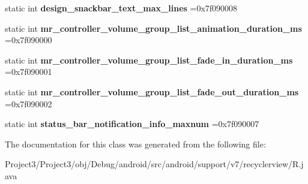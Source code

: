 \begin{DoxyCompactItemize}
static int {\bfseries design\+\_\+snackbar\+\_\+text\+\_\+max\+\_\+lines} =0x7f090008
\item 
\mbox{\label{classandroid_1_1support_1_1v7_1_1recyclerview_1_1R_1_1integer_a4c830a8a4193b80e7b9346ac0d477501}} 
static int {\bfseries mr\+\_\+controller\+\_\+volume\+\_\+group\+\_\+list\+\_\+animation\+\_\+duration\+\_\+ms} =0x7f090000
\item 
\mbox{\label{classandroid_1_1support_1_1v7_1_1recyclerview_1_1R_1_1integer_a21caea0e9a36238135e4ee26e6438a62}} 
static int {\bfseries mr\+\_\+controller\+\_\+volume\+\_\+group\+\_\+list\+\_\+fade\+\_\+in\+\_\+duration\+\_\+ms} =0x7f090001
\item 
\mbox{\label{classandroid_1_1support_1_1v7_1_1recyclerview_1_1R_1_1integer_ac7758b9bbe417e13ca6dc466fc63c0f5}} 
static int {\bfseries mr\+\_\+controller\+\_\+volume\+\_\+group\+\_\+list\+\_\+fade\+\_\+out\+\_\+duration\+\_\+ms} =0x7f090002
\item 
\mbox{\label{classandroid_1_1support_1_1v7_1_1recyclerview_1_1R_1_1integer_a0d4538d33f5c954842ebcd45556b3398}} 
static int {\bfseries status\+\_\+bar\+\_\+notification\+\_\+info\+\_\+maxnum} =0x7f090007
\end{DoxyCompactItemize}


The documentation for this class was generated from the following file\+:\begin{DoxyCompactItemize}
\item 
Project3/\+Project3/obj/\+Debug/android/src/android/support/v7/recyclerview/R.\+java\end{DoxyCompactItemize}

